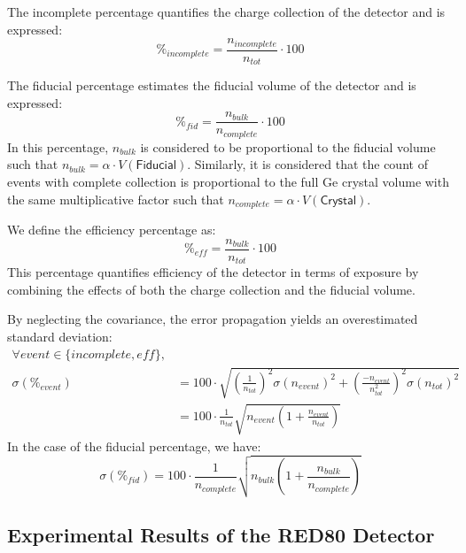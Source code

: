 The incomplete percentage quantifies the charge collection of the detector and is expressed:
\begin{equation}
\%_{incomplete}
=
\frac{n_{incomplete}}{n_{tot}} \cdot 100
\end{equation}

The fiducial percentage estimates the fiducial volume of the detector and is expressed:
\begin{equation}
\%_{fid}
=
\frac{n_{bulk}}{n_{complete}} \cdot 100
\end{equation}
In this percentage, $n_{bulk}$ is considered to be proportional to the fiducial volume such that $n_{bulk} = \alpha \cdot V(\textsf{Fiducial})$. Similarly, it is considered that the count of events with complete collection is proportional to the full Ge crystal volume with the same multiplicative factor such that $n_{complete} = \alpha \cdot V(\textsf{Crystal})$.

We define the efficiency percentage as:
\begin{equation}
\%_{eff}
=
\frac{n_{bulk}}{n_{tot}} \cdot 100
\end{equation}
This percentage quantifies efficiency of the detector in terms of exposure by combining the effects of both the charge collection and the fiducial volume.


By neglecting the covariance, the error propagation yields an overestimated standard deviation:
\begin{equation}
\begin{split}
\forall event \in \{ incomplete, eff \}, & \\
\sigma (\%_{event})
&=
100 \cdot
\sqrt{
\left( \frac{1}{n_{tot}} \right)^2 \sigma(n_{event})^2
+
\left( \frac{-n_{event}}{n_{tot}^2} \right)^2 \sigma(n_{tot})^2
}
\\
&=
100 \cdot
\frac{1}{n_{tot}}
\sqrt{ 
n_{event} \left( 1 + \frac{n_{event}}{n_{tot}} \right)
}
\end{split}
\end{equation}
In the case of the fiducial percentage, we have:
\begin{equation}
\sigma (\%_{fid})
=
100 \cdot
\frac{1}{n_{complete}}
\sqrt{ 
n_{bulk} \left( 1 + \frac{n_{bulk}}{n_{complete}} \right)
}
\end{equation}

\subsection{Experimental Results of the RED80 Detector}
\label{par:red80-comparison}

